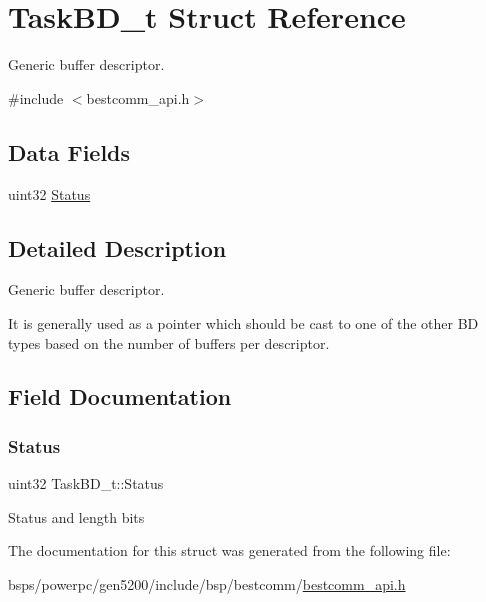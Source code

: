 \hypertarget{structTaskBD__t}{}\section{Task\+B\+D\+\_\+t Struct Reference}
\label{structTaskBD__t}


Generic buffer descriptor.  




{\ttfamily \#include $<$bestcomm\+\_\+api.\+h$>$}

\subsection*{Data Fields}
\begin{DoxyCompactItemize}
\item 
uint32 \mbox{\hyperlink{structTaskBD__t_a03d0051a914d024bc5f4b86b9fc64b21}{Status}}
\end{DoxyCompactItemize}


\subsection{Detailed Description}
Generic buffer descriptor. 

It is generally used as a pointer which should be cast to one of the other BD types based on the number of buffers per descriptor. 

\subsection{Field Documentation}
\mbox{\label{structTaskBD__t_a03d0051a914d024bc5f4b86b9fc64b21}} 
\subsubsection{\texorpdfstring{Status}{Status}}
{\footnotesize\ttfamily uint32 Task\+B\+D\+\_\+t\+::\+Status}

Status and length bits 

The documentation for this struct was generated from the following file\+:\begin{DoxyCompactItemize}
\item 
bsps/powerpc/gen5200/include/bsp/bestcomm/\mbox{\hyperlink{bestcomm__api_8h}{bestcomm\+\_\+api.\+h}}\end{DoxyCompactItemize}
